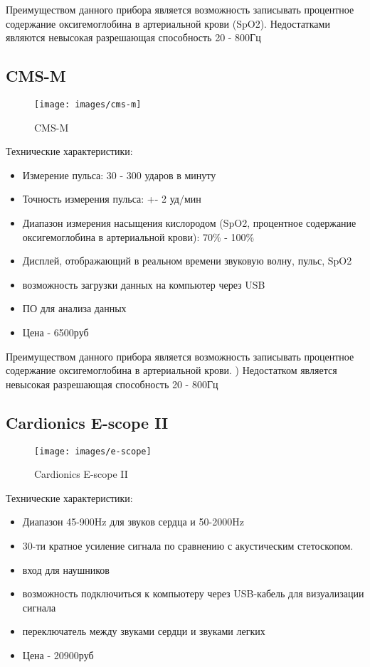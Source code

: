 \documentclass[../main.tex]{subfiles}
\begin{document}
Преимуществом данного прибора является возможность записывать процентное содержание оксигемоглобина в артериальной крови (SpO2). Недостатками являются невысокая разрешающая способность 20 - 800Гц

\subsection{CMS-M}
\begin{figure}[H]
\centering
\texttt{[image: images/cms-m]}
\caption{CMS-M}
\end{figure}

Технические характеристики:\cite{cms-m}
\begin{itemize}
  \item Измерение пульса: 30 - 300 ударов в минуту
  \item Точность измерения пульса: +- 2 уд/мин
  \item Диапазон измерения насыщения кислородом (SpO2, процентное содержание оксигемоглобина в артериальной крови): 70\% - 100\%
  \item Дисплей, отображающий в реальном времени звуковую волну, пульс, SpO2
  \item возможность загрузки данных на компьютер через USB
  \item ПО для анализа данных
  \item Цена - 6500руб
\end{itemize}

Преимуществом данного прибора является возможность записывать процентное содержание оксигемоглобина в артериальной крови. ) Недостатком является невысокая разрешающая способность 20 - 800Гц

\subsection{Cardionics E-scope II}
\begin{figure}[H]
\centering
\texttt{[image: images/e-scope]}
\caption{Cardionics E-scope II}
\end{figure}

Технические характеристики:\cite{cardioics}
\begin{itemize}
  \item Диапазон 45-900Hz для звуков сердца и 50-2000Hz
  \item 30-ти кратное усиление сигнала по сравнению с акустическим стетоскопом.
  \item вход для наушников
  \item возможность подключиться к компьютеру через USB-кабель для визуализации сигнала
  \item переключатель между звуками сердци и звуками легких
  \item Цена - 20900руб
\end{itemize}
\end{document}

